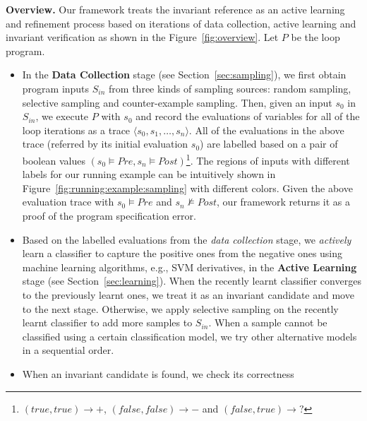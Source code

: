 \medskip\noindent
\textbf{Overview.}
Our framework treats the invariant reference as an active learning and refinement process 
based on iterations of data collection, active learning and invariant verification 
as shown in the Figure~\ref{fig:overview}. 
Let $P$ be the loop program. 
\begin{itemize}
    \item 
    In the \textbf{Data Collection} stage (see Section~\ref{sec:sampling}), 
    we first obtain program inputs $S_{\mathit{in}}$ from three kinds of sampling sources: 
    random sampling, selective sampling and counter-example sampling. 
    Then, given an input $s_0$ in $S_{\mathit{in}}$, we execute $P$ with $s_0$ 
    and record the evaluations of variables for all of the loop iterations
    as a trace $\langle s_0, s_1, \ldots, s_n \rangle$.  
    All of the evaluations in the above trace (referred by its initial evaluation $s_0$) 
    are labelled based on a pair of boolean values 
    $(s_0 \models \mathit{Pre}, s_n \models \mathit{Post})$\footnote{
        $(\mathit{true}, \mathit{true}) \rightarrow +$, 
        $(\mathit{false}, \mathit{false}) \rightarrow -$ 
        and $(\mathit{false}, \mathit{true}) \rightarrow ?$}. 
    The regions of inputs with different labels for our running example can be intuitively shown 
    in Figure~\ref{fig:running:example:sampling} with different colors. 
    Given the above evaluation trace with
    $s_0 \models \mathit{Pre}$ and $s_n \not\models \mathit{Post}$, 
    our framework returns it as a proof of the program specification error. 
    \item 
    Based on the labelled evaluations from the \emph{data collection} stage, 
    we \emph{actively} learn a classifier to capture the positive ones from the negative ones 
    using machine learning algorithms, e.g., SVM derivatives, 
    in the \textbf{Active Learning} stage (see Section~\ref{sec:learning}). 
    When the recently learnt classifier converges to the previously learnt ones, 
    we treat it as an invariant candidate and move to the next stage. 
    Otherwise, we apply selective sampling on the recently learnt classifier 
    to add more samples to $S_{\mathit{in}}$. 
    When a sample cannot be classified using a certain classification model, 
    we try other alternative models in a sequential order. 
    \item 
    When an invariant candidate is found, we check its correctness 

\end{itemize}
